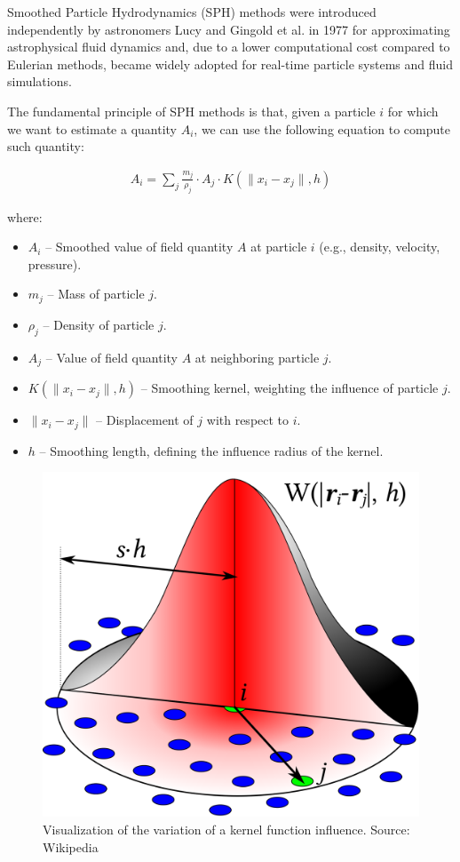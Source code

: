 Smoothed Particle Hydrodynamics (SPH) methods were introduced independently by astronomers Lucy\cite{lucy1977sph} and Gingold et al.\cite{gingold1977smph} in 1977 for approximating astrophysical fluid dynamics and, due to a lower computational cost compared to Eulerian methods, became widely adopted for real-time particle systems and fluid simulations.

\noindent
The fundamental principle of SPH methods is that, given a particle $i$ for which we want to estimate a quantity $A_i$, we can use the following equation to compute such quantity:

\begin{align}
    A_i = \sum_j{\frac{m_j}{\rho_j} \cdot A_j \cdot K(\| x_i - x_j\|, h)} \label{eq:SPH}
\end{align} 

\noindent
where:
\begin{itemize}
\itemsep -1pt
    \item \( A_i \) – Smoothed value of field quantity \( A \) at particle \( i \) (e.g., density, velocity, pressure).
    \item \( m_j \) – Mass of particle \( j \).
    \item \( \rho_j \) – Density of particle \( j \).
    \item \( A_j \) – Value of field quantity \( A \) at neighboring particle \( j \).
    \item \( K(\| x_i - x_j\|, h) \) – Smoothing kernel, weighting the influence of particle \( j \).
    \item \( \| x_i - x_j \| \) – Displacement of \( j \) with respect to \( i \).
    \item \( h \) – Smoothing length, defining the influence radius of the kernel.
\end{itemize}

\begin{figure}[ht!]
    \centering
    \includegraphics[height=0.35\linewidth]{images/SPH_Kernel.png}
    \caption{Visualization of the variation of a kernel function influence. Source: Wikipedia}
    \label{fig:kernelFunc}
\end{figure}

